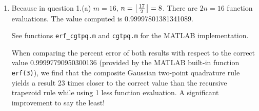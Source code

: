 \documentclass{article}
\DeclarePairedDelimiter\floor{\lfloor}{\rfloor}
\begin{document}
\begin{enumerate}
\begin{enumerate}
\item Because in question 1.(a) $m=16$, $n=\floor*{\frac{17}{2}}=8$. There are $2n=16$ function evaluations. The value computed is 0.99997801381341089.

See functions \texttt{erf\_cgtpq.m} and \texttt{cgtpq.m} for the MATLAB implementation.

When comparing the percent error of both results with respect to the correct value 0.99997790950300136 (provided by the MATLAB built-in function \texttt{erf(3)}), we find that the composite Gaussian two-point quadrature
rule yields a result 23 times closer to the correct value than the recursive trapezoid rule while using 1 less function evaluation. A significant improvement to say the least!

\end{enumerate}
\end{enumerate}
\end{document}
